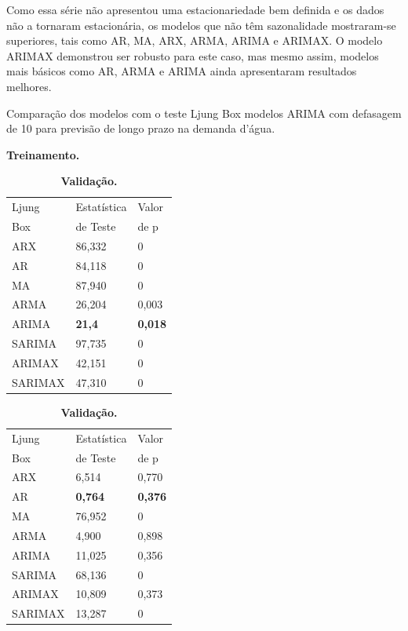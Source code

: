 Como essa série não apresentou uma estacionariedade bem definida e os dados não a tornaram estacionária, os modelos que não têm sazonalidade mostraram-se superiores, tais como AR, MA, ARX, ARMA, ARIMA e ARIMAX. O modelo ARIMAX demonstrou ser robusto para este caso, mas mesmo assim, modelos mais básicos como AR, ARMA e ARIMA ainda apresentaram resultados melhores.

\begin{table}[H]
	\centering		
	\caption{Comparação dos modelos com o teste Ljung Box modelos ARIMA com defasagem de 10 para previsão de longo prazo na demanda d'água.}
	
	\begin{subtable}{0.49\linewidth}
		\centering
		\caption{\textbf{Treinamento.}} \label{tb:lbtrn}
		\begin{tabular}{@{}lll@{}}
			\toprule
			Ljung  & Estatística  & Valor \\
			Box & de Teste& de p\\\midrule
			ARX & 86,332 & 0           \\
			AR  & 84,118 & 0            \\
			MA  & 87,940 & 0             \\
			ARMA & 26,204 & 0,003         \\
			ARIMA & \textbf{21,4} &\textbf{0,018}  \\
			SARIMA & 97,735 & 0 \\
			ARIMAX & 42,151 & 0   \\
			SARIMAX  & 47,310 & 0                    \\ \bottomrule
		\end{tabular}
	\end{subtable}
	\hfill
	\begin{subtable}{0.49\linewidth}
		\centering
		\caption{\textbf{Validação.}} \label{tb:lbvld}
		\begin{tabular}{@{}lll@{}}
			\toprule
			Ljung  & Estatística  & Valor \\
			Box & de Teste& de p\\\midrule
			ARX       & 6,514                         & 0,770               \\
			AR        & \textbf{0,764}              & \textbf{0,376}     \\
			MA        & 76,952                        & 0                   \\
			ARMA      & 4,900                         & 0,898               \\
			ARIMA     & 11,025                        & 0,356               \\
			SARIMA    & 68,136                        & 0                   \\
			ARIMAX    & 10,809                        & 0,373               \\
			SARIMAX   & 13,287                        & 0                   \\ \bottomrule
		\end{tabular}
	\end{subtable}
			

\end{table}
